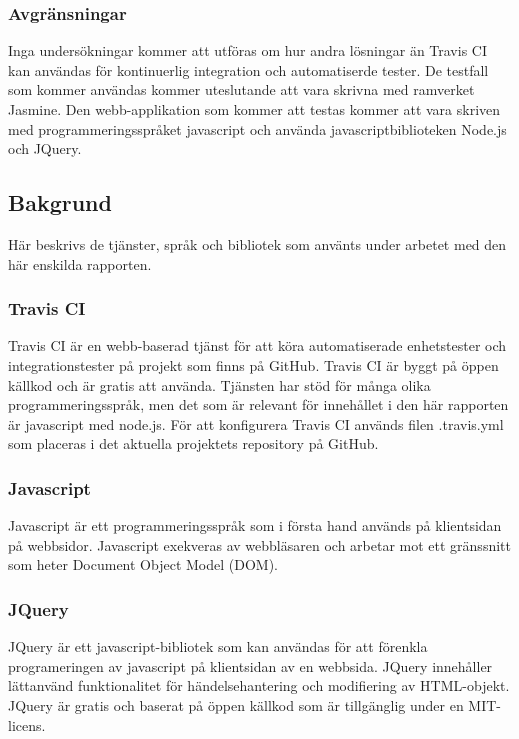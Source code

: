 \subsubsection{Avgränsningar}
Inga undersökningar kommer att utföras om hur andra lösningar än 
Travis CI kan användas för kontinuerlig 
integration och automatiserde tester. De testfall som kommer användas 
kommer uteslutande att vara skrivna med ramverket Jasmine. Den webb-applikation
som kommer att testas kommer att vara skriven med programmeringsspråket
javascript och använda javascriptbiblioteken Node.js och JQuery.

\subsection{Bakgrund}
Här beskrivs de tjänster, språk och bibliotek som använts under arbetet
med den här enskilda rapporten.

\subsubsection{Travis CI}
Travis CI är en webb-baserad tjänst för att köra automatiserade enhetstester och integrationstester
på projekt som finns på GitHub. Travis CI är byggt på öppen källkod och är gratis att använda. 
Tjänsten har stöd för många olika programmeringsspråk, men det som är 
relevant för innehållet i den här rapporten
är javascript med node.js. För att konfigurera Travis CI används filen .travis.yml 
som placeras i det aktuella
projektets repository på GitHub.

\subsubsection{Javascript}
Javascript är ett programmeringsspråk som i första hand används på klientsidan på webbsidor.
Javascript exekveras av webbläsaren och arbetar mot ett gränssnitt som heter 
Document Object Model (DOM).

\subsubsection{JQuery}
JQuery är ett javascript-bibliotek som kan användas för att förenkla programeringen
av javascript på klientsidan av en webbsida. JQuery innehåller lättanvänd
funktionalitet för händelsehantering och modifiering av HTML-objekt.
JQuery är gratis och baserat på öppen källkod som är tillgänglig under en
MIT-licens.


